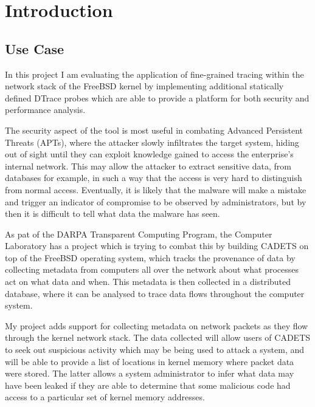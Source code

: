 \documentclass[a4paper,12pt,twoside,openright]{report}
\begin{document}
	\listoffigures
	
	
	\pagestyle{headings}
	
	\chapter{Introduction}
	
	\section{Use Case}
	
	In this project I am evaluating the application of fine-grained tracing within the network stack of the FreeBSD kernel by implementing additional statically defined DTrace probes which are able to provide a platform for both security and performance analysis.
	
	The security aspect of the tool is most useful in combating Advanced Persistent Threats (APTs)\cite{Tankard-APT}, where the attacker slowly infiltrates the target system, hiding out of sight until they can exploit knowledge gained to access the enterprise’s internal network. This may allow the attacker to extract sensitive data, from databases for example, in such a way that the access is very hard to distinguish from normal access. Eventually, it is likely that the malware will make a mistake and trigger an indicator of compromise to be observed by administrators, but by then it is difficult to tell what data the malware has seen.
	
	As pat of the DARPA Transparent Computing Program\cite{DARPA-CT}, the Computer Laboratory has a project which is trying to combat this by building CADETS\cite{CADETS-main} on top of the FreeBSD operating system, which tracks the provenance of data by collecting metadata from computers all over the network about what processes act on what data and when. This metadata is then collected in a distributed database, where it can be analysed to trace data flows throughout the computer system.
	
	My project adds support for collecting metadata on network packets as they flow through the kernel	network stack. The data collected will allow users of CADETS to seek out suspicious activity which may be being used to attack a system, and will be able to provide a list of locations in kernel memory where packet data were stored. The latter allows a system administrator to infer what data may have been leaked if they are able to determine that some malicious code had access to a particular set of kernel memory addresses.
	
\end{document}
